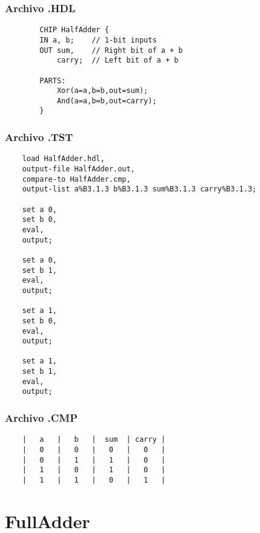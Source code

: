 \documentclass[12pt]{article}
\begin{document}
        \subsubsection{Archivo .HDL}
            \begin{lstlisting}
        CHIP HalfAdder {
        IN a, b;    // 1-bit inputs
        OUT sum,    // Right bit of a + b 
            carry;  // Left bit of a + b
    
        PARTS:
            Xor(a=a,b=b,out=sum);
            And(a=a,b=b,out=carry);
        }
            \end{lstlisting}
            \newpage
        \subsubsection{Archivo .TST}
    \begin{lstlisting}
    load HalfAdder.hdl,
    output-file HalfAdder.out,
    compare-to HalfAdder.cmp,
    output-list a%B3.1.3 b%B3.1.3 sum%B3.1.3 carry%B3.1.3;
    
    set a 0,
    set b 0,
    eval,
    output;
    
    set a 0,
    set b 1,
    eval,
    output;
    
    set a 1,
    set b 0,
    eval,
    output;
    
    set a 1,
    set b 1,
    eval,
    output;

    \end{lstlisting}
        \subsubsection{Archivo .CMP}
    \begin{lstlisting}
    |   a   |   b   |  sum  | carry |
    |   0   |   0   |   0   |   0   |
    |   0   |   1   |   1   |   0   |
    |   1   |   0   |   1   |   0   |
    |   1   |   1   |   0   |   1   |
    \end{lstlisting}
\newpage
\section{FullAdder}
\end{document}

